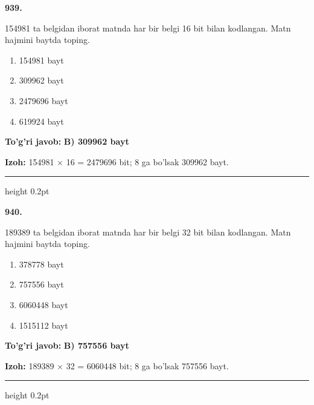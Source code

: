 \documentclass[10pt,a4paper,oneside]{article}
\begin{document}
\noindent\textbf{\color{ink}939.}
\par
154981 ta belgidan iborat matnda har bir belgi 16 bit bilan kodlangan. Matn hajmini baytda toping.
\begin{enumerate}[label=\Alph*),leftmargin=9mm]
\item 154981 bayt
\item 309962 bayt
\item 2479696 bayt
\item 619924 bayt
\end{enumerate}
\begin{tcolorbox}[enhanced,breakable,colback=teal!4,colframe=teal!50!black,boxrule=0.5pt,arc=1.1mm,left=3mm,right=3mm,top=1.7mm,bottom=1.7mm,before skip=2mm,after skip=2mm]
\textbf{\color{teal}To'g'ri javob:} \textbf{B) 309962 bayt}
\par\smallskip
\textbf{Izoh:} 154981 \ensuremath{\times} 16 = 2479696 bit; 8 ga bo'lsak 309962 bayt.
\end{tcolorbox}
\vspace{2mm}\hrule height 0.2pt \vspace{3mm}

\noindent\textbf{\color{ink}940.}
\par
189389 ta belgidan iborat matnda har bir belgi 32 bit bilan kodlangan. Matn hajmini baytda toping.
\begin{enumerate}[label=\Alph*),leftmargin=9mm]
\item 378778 bayt
\item 757556 bayt
\item 6060448 bayt
\item 1515112 bayt
\end{enumerate}
\begin{tcolorbox}[enhanced,breakable,colback=teal!4,colframe=teal!50!black,boxrule=0.5pt,arc=1.1mm,left=3mm,right=3mm,top=1.7mm,bottom=1.7mm,before skip=2mm,after skip=2mm]
\textbf{\color{teal}To'g'ri javob:} \textbf{B) 757556 bayt}
\par\smallskip
\textbf{Izoh:} 189389 \ensuremath{\times} 32 = 6060448 bit; 8 ga bo'lsak 757556 bayt.
\end{tcolorbox}
\vspace{2mm}\hrule height 0.2pt \vspace{3mm}
\end{document}
